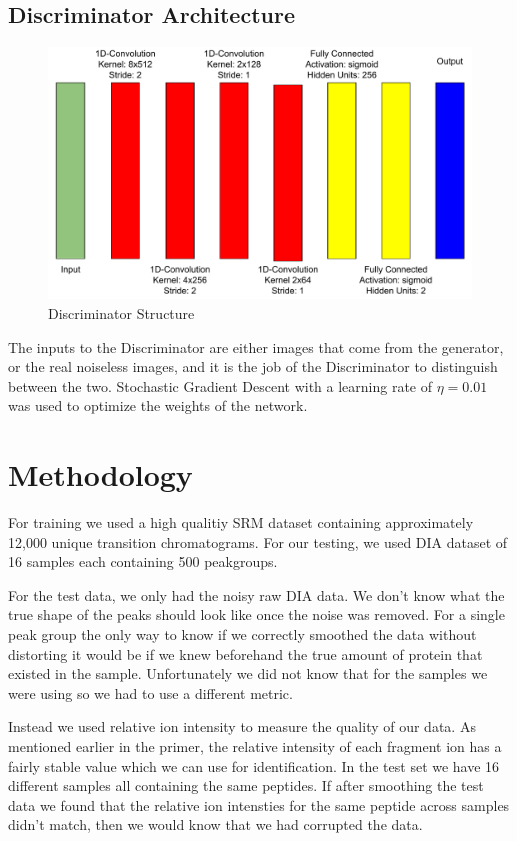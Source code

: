 \documentclass[12pt]{article}
\begin{document}
{\subsection{Discriminator Architecture}
\begin{center}
\begin{figure}
\includegraphics[scale=0.5]{TopoDiscriminator}
\caption{Discriminator Structure}
\end{figure}
\end{center}
The inputs to the Discriminator are either images that come from the
generator, or the real noiseless images, and it is the job of the Discriminator
to distinguish between the two. Stochastic Gradient Descent with a learning rate
of $\eta = 0.01$ was used to optimize the weights of the network.


\section{Methodology}
For training we used a high qualitiy SRM dataset\cite{Smooth_data} containing approximately 12,000 unique transition chromatograms. For our testing, we used DIA dataset \cite{TRIC} of 16 samples each containing 500 peakgroups.

For the test data, we only had the noisy raw DIA data. We don't know what the true shape of the peaks should look like once the noise was removed. For a single peak group the only way to know if we correctly smoothed the data without distorting it would be if we knew beforehand the true amount of protein that existed in the sample. Unfortunately we did not know that for the samples we were using so we had to use a different metric. 

Instead we used relative ion intensity to measure the quality of our data. As mentioned earlier in the primer, the relative intensity of each fragment ion has a fairly stable value which we can use for identification. In the test set we have 16 different samples all containing the same peptides. If after smoothing the test data we found that the relative ion intensties for the same peptide across samples didn't match, then we would know that we had corrupted the data. 

}
\end{document}
